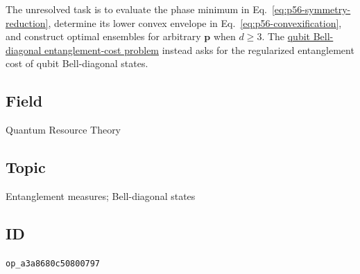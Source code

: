 The unresolved task is to evaluate the phase minimum in
Eq.~\eqref{eq:p56-symmetry-reduction}, determine its lower convex envelope in
Eq.~\eqref{eq:p56-convexification}, and construct optimal ensembles for
arbitrary $\mathbf p$ when $d\geq3$.  The
\href{https://qiqc-op.com/problem/op_aa21ac5ebca8b888/}{qubit Bell-diagonal entanglement-cost problem}
instead asks for the regularized entanglement cost of qubit Bell-diagonal
states.

\subsection*{Field}

Quantum Resource Theory

\subsection*{Topic}

Entanglement measures; Bell-diagonal states

\subsection*{ID}

\texttt{op\_a3a8680c50800797}
